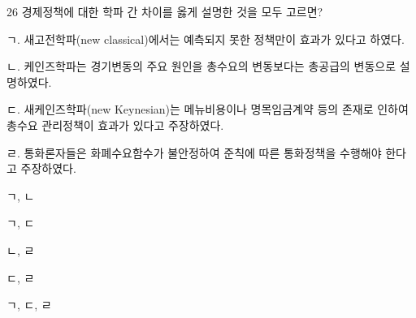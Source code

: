 \begin{question}{26}
경제정책에 대한 학파 간 차이를 옳게 설명한 것을 모두 고르면?
\begin{framedtext}
ㄱ. 새고전학파(new classical)에서는 예측되지 못한 정책만이 효과가 있다고 하였다. \par
ㄴ. 케인즈학파는 경기변동의 주요 원인을 총수요의 변동보다는 총공급의 변동으로 설명하였다. \par
ㄷ. 새케인즈학파(new Keynesian)는 메뉴비용이나 명목임금계약 등의 존재로 인하여 총수요 관리정책이 효과가 있다고 주장하였다. \par
ㄹ. 통화론자들은 화폐수요함수가 불안정하여 준칙에 따른 통화정책을 수행해야 한다고 주장하였다. \par
\end{framedtext}
\begin{choices}
  \item ㄱ, ㄴ
  \item ㄱ, ㄷ
  \item ㄴ, ㄹ
  \item ㄷ, ㄹ
  \item ㄱ, ㄷ, ㄹ
\end{choices}
\end{question}
